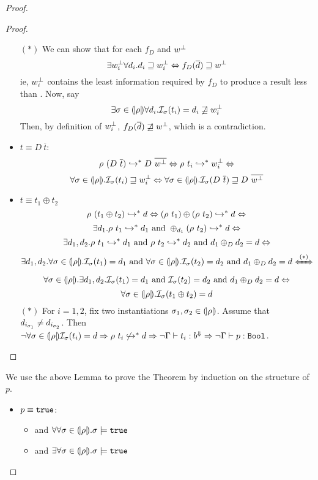 \begin{proof}
\begin{proof}
\begin{itemize}
$(*)$ We can show that for each $f_D$ and $w^\perp$ 
	$$	
		\exists w^\perp_i\forall d_i. d_i\sqsupseteq w^\perp_i \Leftrightarrow f_D(\overline{d}) \sqsupseteq w^\perp 
	$$
ie, $w^\perp_i$ contains the least information required by $f_D$
to produce a result less than \botv.
Now, say $$ \exists\sigma \in (\!|\rho|\!)\forall d_i.\mathcal{I}_{\sigma}(t_i) = {d_i}\not \sqsupseteq w^\perp_i $$
Then, by definition of $w^\perp_i$,
$f_D(\overline{d}) \not\sqsupseteq w^\perp $, which is a contradiction.
\item $t \equiv D\ \overline{t}$: 
	$$
		\evals{\rho\ (D\ \overline{t})}{D\ \overline{\botv}} \Leftrightarrow
		\evals{\rho\ t_i}{\botv_i} \Leftrightarrow
	$$
	$$
		\forall\sigmamodel \in \instance{\rho}.\interpIGEq{\sigmamodel}{t_i}{\botv_i} \Leftrightarrow
		\forall\sigmamodel \in \instance{\rho}.\interpIGEq{\sigmamodel}{D\ \overline{t}}{D\ \overline{\botv}} 
	$$
\item $t \equiv t_1 \oplus t_2 $
	$$
		\rho\ (t_1 \oplus t_2) \hookrightarrow_{}^{*} d \Leftrightarrow
		(\rho\ t_1) \oplus (\rho\ t_2) \hookrightarrow_{}^{*} d \Leftrightarrow	
	$$
	$$
		\exists d_1.\evals{\rho\ t_1}{d_1} \text{ and }  \evals{\oplus_{d_1} (\rho\ t_2)}{d} \Leftrightarrow
	$$
	$$	
		\exists d_1, d_2.\rho\ t_1 \hookrightarrow_{}^{*} d_1 \text{ and }  \rho\ t_2 \hookrightarrow_{}^{*} d_2 \text{ and } d_1 \oplus_D d_2 = d \Leftrightarrow	
	$$
	$$	
		\exists d_1, d_2.\forall\sigmamodel \in \instance{\rho}.\interpIEq{\sigmamodel}{t_1}{d_1} \text{ and }  
		\forall\sigmamodel \in \instance{\rho}.\interpIEq{\sigmamodel}{t_2}{d_2} \text{ and } d_1 \oplus_D d_2 = d \xLeftrightarrow{(*)}	
	$$
	$$	
		\forall\sigma \in (\!|\rho|\!).
		\exists d_1, d_2.\mathcal{I}_{\sigma}(t_1) = d_1 \text{ and }  
		\mathcal{I}_{\sigma}(t_2) = d_2 \text{ and } d_1 \oplus_D d_2 = d \Leftrightarrow	
	$$
	$$	
		\forall\sigma \in (\!|\rho|\!).\mathcal{I}_{\sigma}(t_1 \oplus t_2) = d 
	$$
$(*)$ For $i = 1 , 2$, fix two instantiations
$\sigma_1, \sigma_2 \in (\!|\rho|\!)$. 
Assume that $d_{i_{\sigma_1}} \not = d_{i_{\sigma_2}}$.
Then $\lnot \forall \sigma \in (\!|\rho|\!) \mathcal{I}_{\sigma}(t_i) = d \Rightarrow \rho\ t_i \not \hookrightarrow_{}^{*} d \Rightarrow \lnot \Gamma \vdash t_i : b^{\Downarrow} \Rightarrow \lnot \Gamma \vdash p : \mathtt{Bool}$.
\end{itemize}
\end{proof}

We use the above Lemma to prove the Theorem by induction on the structure of $p$.
\begin{itemize}
\item $ p \equiv \mathtt{true}$:
\begin{itemize}
\item \eval{\rho\ \etrue}{\etrue} and $\forall\forall\sigma \in  (\!|\rho|\!). \sigma \models \mathtt{true}$
\item \eval{\rho\ \etrue\not}{\efalse} and $\exists \forall\sigma \in  (\!|\rho|\!). \sigma \models \mathtt{true}$
\end{itemize}


\end{itemize}
\end{proof}
